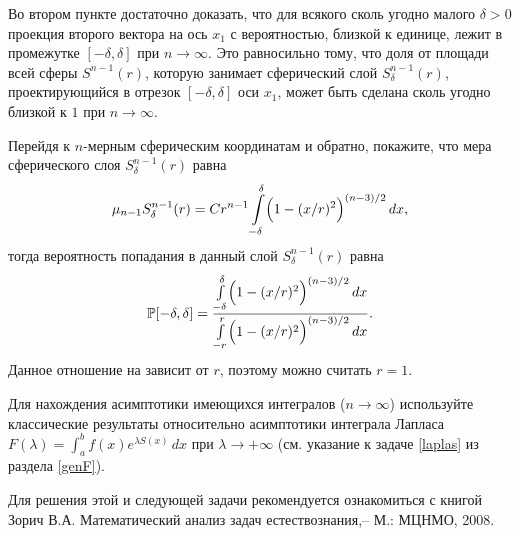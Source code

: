 \begin{remark}
Во втором пункте достаточно доказать, что для всякого сколь угодно малого $\delta>0$ проекция второго вектора на ось $x_1$ с вероятностью, близкой к 
единице, лежит в промежутке $[-\delta, \delta]$ при $n\to\infty$. Это равносильно тому, что доля от площади всей сферы $S^{n-1}(r)$, 
которую занимает сферический слой $S^{n-1}_{\delta}(r)$, проектирующийся в отрезок $[-\delta, \delta]$ оси $x_1$, 
может быть сделана сколь угодно близкой к $1$ при $n\to\infty$. 

Перейдя к $n$-мерным сферическим координатам и обратно, покажите, что мера сферического слоя $S^{n-1}_{\delta}(r)$ равна 
$$
\mu_{n-1} S_{\delta}^{n-1}(r) = Cr^{n-1} 
\int\limits_{-\delta}^{\delta} \Bigl( 1-(x/r)^2\Bigr)^{(n-3)/2} \, dx ,
$$
тогда вероятность попадания в данный слой $S_{\delta}^{n-1}(r)$ равна 
$$
{\mathbb P}[-\delta, \delta]=\frac{\int\limits_{-\delta}^{\delta} \Bigl( 1-(x/r)^2\Bigr)^{(n-3)/2} \, dx}
{\int\limits_{-r}^{r} \Bigl( 1-(x/r)^2\Bigr)^{(n-3)/2} \, dx} . 
$$
Данное отношение на зависит от $r$, поэтому можно считать $r=1$. 

Для нахождения асимптотики имеющихся интегралов ($n\to\infty$) используйте классические результаты относительно асимптотики интеграла 
Лапласа $F(\lambda)=\int_a^b f(x)e^{\lambda S(x)}\, dx$ при $\lambda\to +\infty$ (см. указание к задаче \ref{laplas} из раздела  \ref{genF}). %

Для решения этой и следующей задачи рекомендуется ознакомиться с книгой Зорич В.А. Математический анализ задач естествознания,-- М.: МЦНМО, 2008.
\end{remark}



